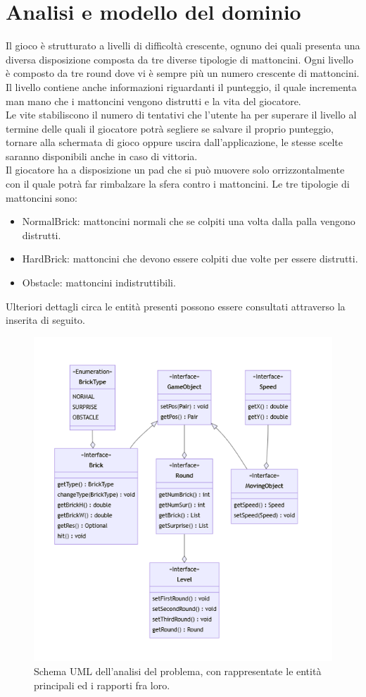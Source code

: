 \documentclass[a4paper,12pt]{report}
\begin{document}
\section{Analisi e modello del dominio}
Il gioco è strutturato a livelli di difficoltà crescente, ognuno dei quali presenta una diversa disposizione composta da tre diverse tipologie di mattoncini. Ogni livello è composto da tre round dove vi è sempre più un numero crescente di mattoncini.
Il livello contiene anche informazioni riguardanti il punteggio, il quale incrementa man mano che i mattoncini vengono distrutti e la vita del giocatore.
\\Le vite stabiliscono il numero di tentativi che l'utente ha per superare il livello al termine delle quali il giocatore potrà segliere se salvare il proprio punteggio, tornare alla schermata di gioco oppure uscira dall'applicazione, le stesse scelte saranno disponibili anche in caso di vittoria.
\\Il giocatore ha a disposizione un pad che si può muovere solo orrizzontalmente con il quale potrà far rimbalzare la sfera contro i mattoncini.
Le tre tipologie di mattoncini sono:
\begin{itemize}
    \item NormalBrick: mattoncini normali che se colpiti una volta dalla palla vengono distrutti.
    \item HardBrick: mattoncini che devono essere colpiti due volte per essere distrutti.
    \item Obstacle: mattoncini indistruttibili.
\end{itemize}
Ulteriori dettagli circa le entità presenti possono essere consultati attraverso la  inserita di seguito.
\begin{figure}[H]
    \centering{}
    \includegraphics[scale=0.8]{images/analysis.png}
    \caption{Schema UML dell'analisi del problema, con rappresentate le entità principali ed i rapporti fra loro.}
    \label{images:analysis}
\end{figure}
\end{document}
